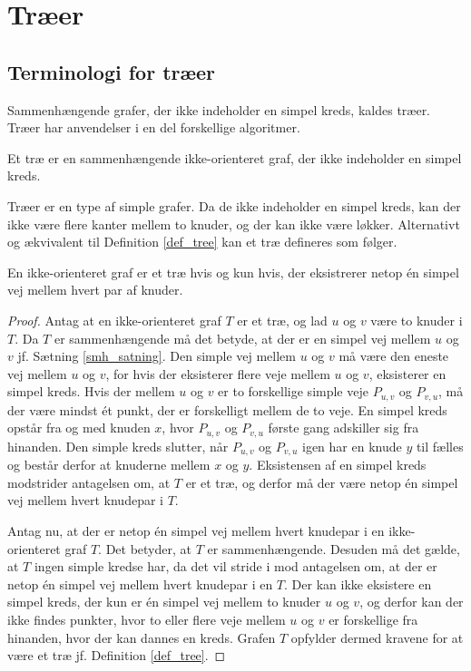 \chapter{Træer}
\section{Terminologi for træer}

Sammenhængende grafer, der ikke indeholder en simpel kreds, kaldes træer. Træer har anvendelser i en del forskellige algoritmer.

\begin{defn}
Et træ er en sammenhængende ikke-orienteret graf, der ikke indeholder en simpel kreds.
\label{def_tree}
\end{defn}

\noindent Træer er en type af simple grafer. Da de ikke indeholder en simpel kreds, kan der ikke være flere kanter mellem to knuder, og der kan ikke være løkker. Alternativt og ækvivalent til Definition \ref{def_tree} kan et træ defineres som følger.

\begin{thm}
En ikke-orienteret graf er et træ hvis og kun hvis, der eksistrerer netop én simpel vej mellem hvert par af knuder. 
\end{thm}

\begin{proof}
Antag at en ikke-orienteret graf $T$ er et træ, og lad $u$ og $v$ være to knuder i $T$. 
Da $T$ er sammenhængende må det betyde, at der er en simpel vej mellem $u$ og $v$ jf. Sætning \ref{smh_satning}. 
Den simple vej mellem $u$ og $v$ må være den eneste vej mellem $u$ og $v$, for hvis der eksisterer flere veje mellem $u$ og $v$, eksisterer en simpel kreds. 
Hvis der mellem $u$ og $v$ er to forskellige simple veje $P_{u,v}$ og $P_{v,u}$, må der være mindst ét punkt, der er forskelligt mellem de to veje. 
En simpel kreds opstår fra og med knuden $x$, hvor $P_{u,v}$ og $P_{v,u}$ første gang adskiller sig fra hinanden. 
Den simple kreds slutter, når $P_{u,v}$ og $P_{v,u}$ igen har en knude $y$ til fælles og består derfor at knuderne mellem $x$ og $y$.
Eksistensen af en simpel kreds modstrider antagelsen om, at $T$ er et træ, og derfor må der være netop én simpel vej mellem hvert knudepar i $T$.

Antag nu, at der er netop én simpel vej mellem hvert knudepar i en ikke-orienteret graf $T$. Det betyder, at $T$ er sammenhængende. Desuden må det gælde, at $T$ ingen simple kredse har, da det vil stride i mod antagelsen om, at der er netop én simpel vej mellem hvert knudepar i en $T$. Der kan ikke eksistere en simpel kreds, der kun er én simpel vej mellem to knuder $u$ og $v$, og derfor kan der ikke findes punkter, hvor to eller flere veje mellem $u$ og $v$ er forskellige fra hinanden, hvor der kan dannes en kreds. Grafen $T$ opfylder dermed kravene for at være et træ jf. Definition \ref{def_tree}.
\end{proof}

